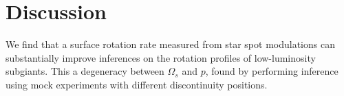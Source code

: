 \section{Discussion}
\label{sec:discussion}

We find that a surface rotation rate measured from star spot modulations can substantially improve inferences on the rotation profiles of low-luminosity subgiants. 
This  a degeneracy between $\Omega_s$ and $p$, found by performing inference using mock experiments with different discontinuity positions.
